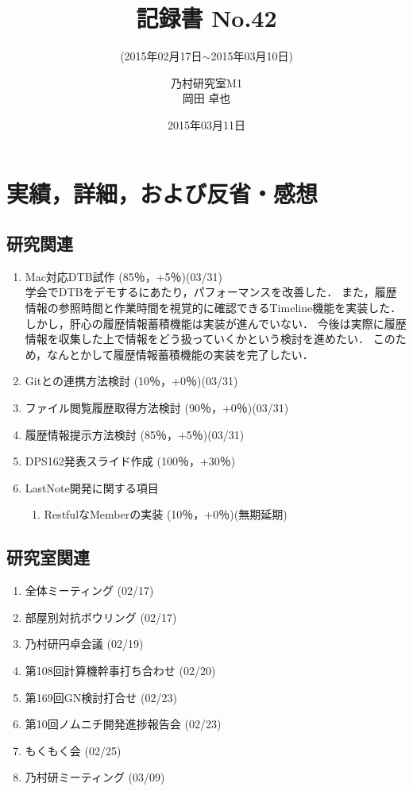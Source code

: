 \documentclass[fleqn, 12pt]{extarticlej}
\subtitle{(2015年02月17日$\sim$2015年03月10日)}
\author{乃村研究室M1\\岡田 卓也}
\date{2015年03月11日}
\title{記録書 No.42}
\begin{document}
\maketitle
\section{実績，詳細，および反省・感想}
  \subsection{研究関連}
  \begin{enumerate}
   \item Mac対応DTB試作
         \hfill
         (85％，+5％)(03/31)\\
         学会でDTBをデモするにあたり，パフォーマンスを改善した．
         また，履歴情報の参照時間と作業時間を視覚的に確認できるTimeline機能を実装した．
         しかし，肝心の履歴情報蓄積機能は実装が進んでいない．
         今後は実際に履歴情報を収集した上で情報をどう扱っていくかという検討を進めたい．
         このため，なんとかして履歴情報蓄積機能の実装を完了したい．
   \item Gitとの連携方法検討
         \hfill
         (10％，+0％)(03/31)
   \item ファイル閲覧履歴取得方法検討
         \hfill
         (90％，+0％)(03/31)
   \item 履歴情報提示方法検討
         \hfill
         (85％，+5％)(03/31)
   \item DPS162発表スライド作成
         \hfill
         (100％，+30％)
   \item LastNote開発に関する項目
         \hfill
         \begin{enumerate}
          \item RestfulなMemberの実装
                \hfill
                (10％，+0％)(無期延期)
         \end{enumerate}
  \end{enumerate}

  \subsection{研究室関連}
  \begin{enumerate}
   \item 全体ミーティング
         \hfill
         (02/17)
   \item 部屋別対抗ボウリング
         \hfill
         (02/17)
   \item 乃村研円卓会議
         \hfill
         (02/19)
   \item 第108回計算機幹事打ち合わせ
         \hfill
         (02/20)
   \item 第169回GN検討打合せ
         \hfill
         (02/23)
   \item 第10回ノムニチ開発進捗報告会
         \hfill
         (02/23)
   \item もくもく会
         \hfill
         (02/25)
   \item 乃村研ミーティング
         \hfill
         (03/09)
  \end{enumerate}
\end{document}
